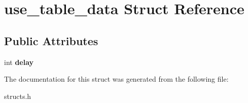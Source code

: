 \hypertarget{structuse__table__data}{\section{use\-\_\-table\-\_\-data Struct Reference}
\label{structuse__table__data}
}
\subsection*{Public Attributes}
\begin{DoxyCompactItemize}
\item 
\hypertarget{structuse__table__data_a0bed5aa159e7438c39f1dba2a9feffaf}{int {\bfseries delay}}\label{structuse__table__data_a0bed5aa159e7438c39f1dba2a9feffaf}

\end{DoxyCompactItemize}


The documentation for this struct was generated from the following file\-:\begin{DoxyCompactItemize}
\item 
structs.\-h\end{DoxyCompactItemize}
